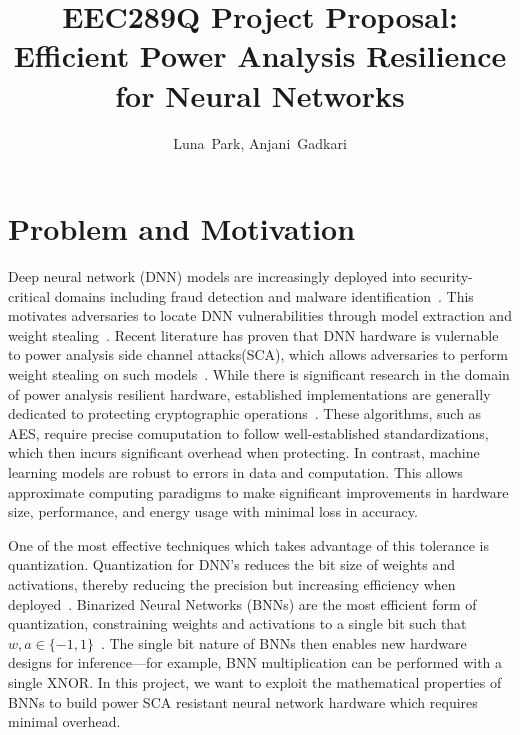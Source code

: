 \documentclass[journal,onecolumn]{IEEEtran}
\begin{document}
\title{EEC289Q Project Proposal: Efficient Power Analysis Resilience for Neural Networks}

\author{Luna~Park,
        Anjani~Gadkari
}

\maketitle
\section{Problem and Motivation}
Deep neural network (DNN) models are increasingly deployed into security-critical domains including fraud detection and malware 
identification~\cite{alarfajCreditCardFraud2022, vinayakumarRobustIntelligentMalware2019}. This motivates adversaries to locate DNN 
vulnerabilities through model extraction and weight stealing~\cite{chakrabortySurveyAdversarialAttacks2021,rakinDeepStealAdvancedModel2022}. Recent literature has proven that DNN hardware is vulernable to power 
analysis side channel attacks(SCA), which allows adversaries to perform weight stealing on such 
models~\cite{majiLeakyNetsRecovering2021}. While there is significant research in the domain of power analysis resilient hardware, 
established implementations are generally dedicated to protecting cryptographic 
operations~\cite{heHowSecureYour2017,zhaoSideChannelSecurity2023,srivastavaSCARPowerSideChannel2024a}. These algorithms, such as 
AES, require precise comuputation to follow well-established standardizations, which then incurs significant overhead when protecting. 
In contrast, machine learning models are robust to errors in data and computation. This allows approximate computing paradigms to make 
significant improvements in hardware size, performance, and energy usage with minimal loss in accuracy. 

One of the most effective techniques which takes advantage of this tolerance is quantization. Quantization for DNN's reduces 
the bit size of weights and activations, thereby reducing the precision but increasing efficiency when deployed~\cite{rokhComprehensiveSurveyModel2023}. Binarized
Neural Networks (BNNs) are the most efficient form of quantization, constraining weights and activations to a single bit such
that $w, a \in \{-1, 1\}$~\cite{courbariauxBinarizedNeuralNetworks2016}. The single bit nature of BNNs then enables new hardware designs for inference—for example, 
BNN multiplication can be performed with a single XNOR. In this project, we want to exploit the mathematical properties of BNNs
to build power SCA resistant neural network hardware which requires minimal overhead.
\end{document}
